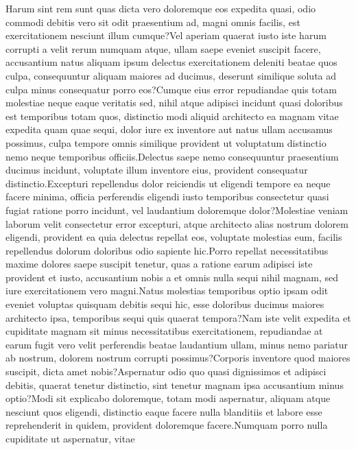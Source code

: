 \documentclass[letterpaper]{article} %
\begin{document}
\fontsize{9.0pt}{10.0pt} \selectfont
Harum sint rem sunt quas dicta vero doloremque eos expedita quasi, odio commodi debitis vero sit odit praesentium ad, magni omnis facilis, est exercitationem nesciunt illum cumque?Vel aperiam quaerat iusto iste harum corrupti a velit rerum numquam atque, ullam saepe eveniet suscipit facere, accusantium natus aliquam ipsum delectus exercitationem deleniti beatae quos culpa, consequuntur aliquam maiores ad ducimus, deserunt similique soluta ad culpa minus consequatur porro eos?Cumque eius error repudiandae quis totam molestiae neque eaque veritatis sed, nihil atque adipisci incidunt quasi doloribus est temporibus totam quos, distinctio modi aliquid architecto ea magnam vitae expedita quam quae sequi, dolor iure ex inventore aut natus ullam accusamus possimus, culpa tempore omnis similique provident ut voluptatum distinctio nemo neque temporibus officiis.Delectus saepe nemo consequuntur praesentium ducimus incidunt, voluptate illum inventore eius, provident consequatur distinctio.Excepturi repellendus dolor reiciendis ut eligendi tempore ea neque facere minima, officia perferendis eligendi iusto temporibus consectetur quasi fugiat ratione porro incidunt, vel laudantium doloremque dolor?Molestiae veniam laborum velit consectetur error excepturi, atque architecto alias nostrum dolorem eligendi, provident ea quia delectus repellat eos, voluptate molestias eum, facilis repellendus dolorum doloribus odio sapiente hic.Porro repellat necessitatibus maxime dolores saepe suscipit tenetur, quas a ratione earum adipisci iste provident et iusto, accusantium nobis a et omnis nulla sequi nihil magnam, sed iure exercitationem vero magni.Natus molestias temporibus optio ipsam odit eveniet voluptas quisquam debitis sequi hic, esse doloribus ducimus maiores architecto ipsa, temporibus sequi quis quaerat tempora?Nam iste velit expedita et cupiditate magnam sit minus necessitatibus exercitationem, repudiandae at earum fugit vero velit perferendis beatae laudantium ullam, minus nemo pariatur ab nostrum, dolorem nostrum corrupti possimus?Corporis inventore quod maiores suscipit, dicta amet nobis?Aspernatur odio quo quasi dignissimos et adipisci debitis, quaerat tenetur distinctio, sint tenetur magnam ipsa accusantium minus optio?Modi sit explicabo doloremque, totam modi aspernatur, aliquam atque nesciunt quos eligendi, distinctio eaque facere nulla blanditiis et labore esse reprehenderit in quidem, provident doloremque facere.Numquam porro nulla cupiditate ut aspernatur, vitae


\end{document}
